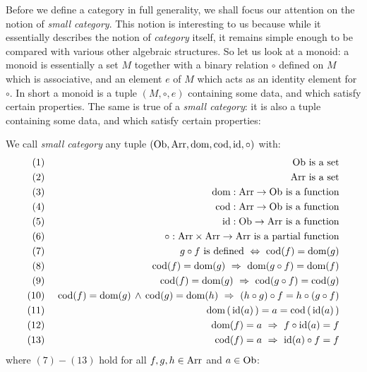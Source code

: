 Before we define a category in full generality, we shall focus our attention
on the notion of {\em small category}. This notion is interesting to us 
because while it essentially describes the notion of {\em category} itself,
it remains simple enough to be compared with various other algebraic structures.
So let us look at a monoid: a monoid is essentially a set $M$ together with 
a binary relation $\circ$ defined on $M$ which is associative, and an 
element $e$ of $M$ which acts as an identity element for $\circ$. In short 
a monoid is a tuple $(M,\circ,e)$ containing some data, and  which satisfy 
certain properties. The same is true of a {\em small category}: it is also
a tuple containing some data, and which satisfy certain properties:
\begin{defin}\label{Cat:def:category:small}
    We call {\em small category} any tuple $(\mbox{\rm Ob}, \mbox{\rm Arr}, \mbox{\rm dom}, \mbox{\rm cod}, \mbox{\rm id}, \circ)$ 
    with:
        \begin{eqnarray*}
            (1)&\ &\mbox{\rm Ob}\mbox{\ is a set}\\
            (2)&\ &\mbox{\rm Arr}\mbox{\ is a set}\\
            (3)&\ &\mbox{\rm dom}:\mbox{\rm Arr}\to\mbox{\rm Ob}\mbox{\ is a function}\\
            (4)&\ &\mbox{\rm cod}:\mbox{\rm Arr}\to\mbox{\rm Ob}\mbox{\ is a function}\\
            (5)&\ &\mbox{\rm id}:\mbox{\rm Ob}\to\mbox{\rm Arr}\mbox{\ is a function}\\
            (6)&\ &\circ:\mbox{\rm Arr}\times\mbox{\rm Arr}\to\mbox{\rm Arr}\mbox{\ is a partial function}\\
            (7)&\ &g\circ f\mbox{\ is defined}
                \ \Leftrightarrow\ \mbox{\rm cod}(f)=\mbox{\rm dom}(g) \\
            (8)&\ &\mbox{\rm cod}(f)=\mbox{\rm dom}(g)\ \Rightarrow\ \mbox{\rm dom}(g\circ f) = \mbox{\rm dom}(f)\\
            (9)&\ &\mbox{\rm cod}(f)=\mbox{\rm dom}(g)\ \Rightarrow\ \mbox{\rm cod}(g\circ f) = \mbox{\rm cod}(g)\\
            (10)&\ &\mbox{\rm cod}(f)=\mbox{\rm dom}(g)\,\land\,\mbox{\rm cod}(g)=\mbox{\rm dom}(h)
               \ \Rightarrow\ (h\circ g)\circ f = h\circ(g\circ f)\\
            (11)&\ &\mbox{\rm dom}\,(\,\mbox{\rm id}(a)\,) = a = \mbox{\rm cod}\,(\,\mbox{\rm id}(a)\,)\\
            (12)&\ &\mbox{\rm dom}(f)=a\ \Rightarrow\ f\circ\mbox{\rm id}(a) = f\\
            (13)&\ &\mbox{\rm cod}(f)=a\ \Rightarrow\ \mbox{\rm id}(a)\circ f = f
       \end{eqnarray*} 
    where $(7)-(13)$ hold for all $f,g,h\in\mbox{\rm Arr}$ and $a\in\mbox{\rm Ob}$: 
\end{defin}

